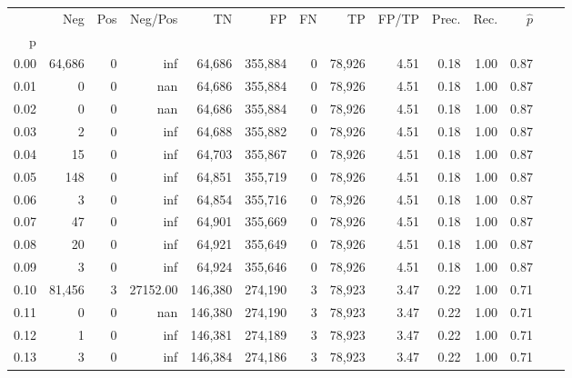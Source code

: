 \begin{tabular}{rrrrrrrrrrrrrr}
\toprule
{} &     Neg &     Pos &   Neg/Pos &       TN &       FP &      FN &      TP & FP/TP & Prec. &  Rec. & $\hat{p}$ \\
p    &         &         &           &          &          &         &         &       &       &       &           \\
\midrule
0.00 &  64,686 &       0 &       inf &   64,686 &  355,884 &       0 &  78,926 &  4.51 &  0.18 &  1.00 &      0.87 \\
0.01 &       0 &       0 &       nan &   64,686 &  355,884 &       0 &  78,926 &  4.51 &  0.18 &  1.00 &      0.87 \\
0.02 &       0 &       0 &       nan &   64,686 &  355,884 &       0 &  78,926 &  4.51 &  0.18 &  1.00 &      0.87 \\
0.03 &       2 &       0 &       inf &   64,688 &  355,882 &       0 &  78,926 &  4.51 &  0.18 &  1.00 &      0.87 \\
0.04 &      15 &       0 &       inf &   64,703 &  355,867 &       0 &  78,926 &  4.51 &  0.18 &  1.00 &      0.87 \\
0.05 &     148 &       0 &       inf &   64,851 &  355,719 &       0 &  78,926 &  4.51 &  0.18 &  1.00 &      0.87 \\
0.06 &       3 &       0 &       inf &   64,854 &  355,716 &       0 &  78,926 &  4.51 &  0.18 &  1.00 &      0.87 \\
0.07 &      47 &       0 &       inf &   64,901 &  355,669 &       0 &  78,926 &  4.51 &  0.18 &  1.00 &      0.87 \\
0.08 &      20 &       0 &       inf &   64,921 &  355,649 &       0 &  78,926 &  4.51 &  0.18 &  1.00 &      0.87 \\
0.09 &       3 &       0 &       inf &   64,924 &  355,646 &       0 &  78,926 &  4.51 &  0.18 &  1.00 &      0.87 \\
0.10 &  81,456 &       3 &  27152.00 &  146,380 &  274,190 &       3 &  78,923 &  3.47 &  0.22 &  1.00 &      0.71 \\
0.11 &       0 &       0 &       nan &  146,380 &  274,190 &       3 &  78,923 &  3.47 &  0.22 &  1.00 &      0.71 \\
0.12 &       1 &       0 &       inf &  146,381 &  274,189 &       3 &  78,923 &  3.47 &  0.22 &  1.00 &      0.71 \\
0.13 &       3 &       0 &       inf &  146,384 &  274,186 &       3 &  78,923 &  3.47 &  0.22 &  1.00 &      0.71 \\

\end{tabular}
